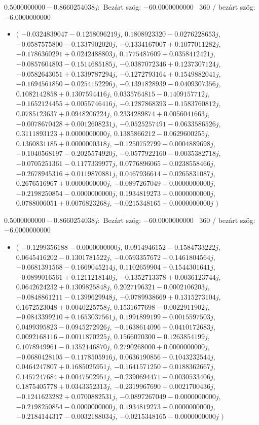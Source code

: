 \documentclass[14pt,a4paper]{article}
\begin{document}
$0.5000000000-0.8660254038j$:\
Bezárt szög: $-60.0000000000$ \
360 / bezárt szög: $-6.0000000000$\
\begin{itemize}
\item
$\big($
$-0.0324839047-0.1258096219j$, $0.1808923320-0.0276228653j$, $-0.0587575800-0.1337902020j$, $-0.1334167007+0.1077011282j$, $-0.1786360291+0.0242488803j$, $0.1775487609+0.0358412421j$, $-0.0857604893-0.1514685185j$, $-0.0387072346+0.1237307124j$, $-0.0582643051+0.1339787294j$, $-0.1272793164+0.1549882041j$, $-0.1694561850-0.0254152296j$, $-0.1391828939-0.0409307356j$, $0.1082142858+0.1307594416j$, $0.0335764815-0.1409157712j$, $-0.1652124455+0.0055746416j$, $-0.1287868393-0.1583760812j$, $0.0785123637+0.0948206224j$, $0.2334289874+0.0056041663j$, $-0.0078670428+0.0012608231j$, $-0.0525257491-0.0633586526j$, $0.3111893123+0.0000000000j$, $0.1385866212-0.0629600255j$, $0.1360831185+0.0000000318j$, $-0.1250752799-0.0004889698j$, $-0.1040568197-0.2025574920j$, $-0.0577922160-0.0035382718j$, $-0.0705251361-0.1177339977j$, $0.0776896065-0.0238558466j$, $-0.2678945316+0.0119870881j$, $0.0467936614+0.0265831087j$, $0.2676516967+0.0000000000j$, $-0.0897267049-0.0000000000j$, $-0.2198250854-0.0000000000j$, $0.1934819273+0.0000000000j$, $0.0788006051+0.0076823268j$, $-0.0215348165+0.0000000000j$
$\big)$
\end{itemize}
$0.5000000000-0.8660254038j$:\
Bezárt szög: $-60.0000000000$ \
360 / bezárt szög: $-6.0000000000$\
\begin{itemize}
\item
$\big($
$-0.1299356188-0.0000000000j$, $0.0914946152-0.1584733222j$, $0.0645416202-0.1301781522j$, $-0.0593357672-0.1461804564j$, $-0.0681391568-0.1669045214j$, $0.1102659904+0.1544301641j$, $-0.0899016561+0.1211218140j$, $-0.1352713378+0.0036123744j$, $0.0642624232+0.1309825848j$, $0.2027196321-0.0002106203j$, $-0.0848861211-0.1399629948j$, $-0.0789938669+0.1315273104j$, $0.1672523048+0.0040225758j$, $0.1531677698-0.0022911902j$, $-0.0843399210+0.1653037561j$, $0.1991899199+0.0015597503j$, $0.0499395823-0.0945272926j$, $-0.1638614096+0.0410172683j$, $0.0092168116-0.0011870225j$, $0.1566070300-0.1263854199j$, $0.1078949961-0.1352146870j$, $0.2790268000+0.0000000000j$, $-0.0680428105-0.1178505916j$, $0.0636190856-0.1043232544j$, $0.0464247807+0.1685025951j$, $-0.1641571250+0.0188362667j$, $0.1457247684+0.0047502951j$, $-0.2390694471-0.0030533406j$, $0.1875405778+0.0343352313j$, $-0.2319967690+0.0021700436j$, $-0.1241623282+0.0700882531j$, $-0.0897267049-0.0000000000j$, $-0.2198250854-0.0000000000j$, $0.1934819273+0.0000000000j$, $-0.2184144317-0.0032188034j$, $-0.0215348165-0.0000000000j$
$\big)$
\end{itemize}
\end{document}
